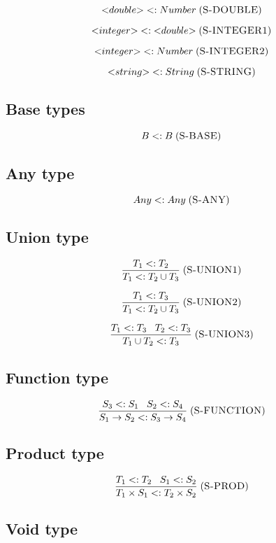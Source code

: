 \documentclass[12pt]{article}
\newcommand{\mylabel}[1]{\; (\textsc{#1})}
\newcommand{\subtype}{<:}
\begin{document}
\[
{<}double{>} \subtype Number
\mylabel{S-DOUBLE}
\]

\[
{<}integer{>} \subtype {<}double{>}
\mylabel{S-INTEGER1}
\]

\[
{<}integer{>} \subtype Number
\mylabel{S-INTEGER2}
\]

\[
{<}string{>} \subtype String
\mylabel{S-STRING}
\]

\subsection{Base types}

\[
B \subtype B
\mylabel{S-BASE}
\]

\subsection{Any type}

\[
Any \subtype Any
\mylabel{S-ANY}
\]

\subsection{Union type}

\[
\frac{T_{1} \subtype T_{2}}
     {T_{1} \subtype T_{2} \cup T_{3}}
\mylabel{S-UNION1}
\]

\[
\frac{T_{1} \subtype T_{3}}
     {T_{1} \subtype T_{2} \cup T_{3}}
\mylabel{S-UNION2}
\]

\[
\frac{T_{1} \subtype T_{3} \;\;\; T_{2} \subtype T_{3}}
     {T_{1} \cup T_{2} \subtype T_{3}}
\mylabel{S-UNION3}
\]

\subsection{Function type}

\[
\frac{S_{3} \subtype S_{1} \;\;\; S_{2} \subtype S_{4}}
     {S_{1} \rightarrow S_{2} \subtype S_{3} \rightarrow S_{4}}
\mylabel{S-FUNCTION}
\]

\subsection{Product type}

\[
\frac{T_{1} \subtype T_{2} \;\;\; S_{1} \subtype S_{2}}
     {T_{1} \times S_{1} \subtype T_{2} \times S_{2}}
\mylabel{S-PROD}
\]

\subsection{Void type}
\end{document}
